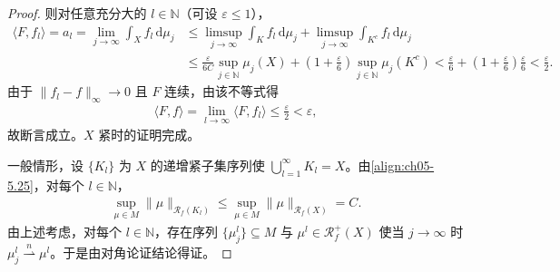 \documentclass[../../main.tex]{subfiles}%
\begin{document}
\begin{proof}
则对任意充分大的 $l\in\mathbb{N}$（可设 $\varepsilon\leqslant1$），
\begin{align*}
\langle F,f_l\rangle=a_l
=\lim_{j\to\infty}\int_X f_l\,\mathrm{d}\mu_j
&\leqslant\limsup_{j\to\infty}\int_K f_l\,\mathrm{d}\mu_j
+\limsup_{j\to\infty}\int_{K^c}f_l\,\mathrm{d}\mu_j\\
&\leqslant\frac{\varepsilon}{6C}\sup_{j\in\mathbb{N}}\mu_j(X)
+\left(1+\frac{\varepsilon}{6}\right)\sup_{j\in\mathbb{N}}\mu_j(K^c)
<\frac{\varepsilon}{6}+\left(1+\frac{\varepsilon}{6}\right)\frac{\varepsilon}{6}
<\frac{\varepsilon}{2}.
\end{align*}
由于 $\|f_l-f\|_\infty\to0$ 且 $F$ 连续，由该不等式得
\begin{align*}
\langle F,f\rangle=\lim_{l\to\infty}\langle F,f_l\rangle
\leqslant\frac{\varepsilon}{2}<\varepsilon,
\end{align*}
故断言成立。$X$ 紧时的证明完成。

一般情形，设 $\{K_l\}$ 为 $X$ 的递增紧子集序列使 $\bigcup_{l=1}^\infty K_l=X$。由\eqref{align:ch05-5.25}，对每个 $l\in\mathbb{N}$，
\begin{align*}
\sup_{\mu\in M}\|\mu\|_{\mathscr{R}_f(K_l)}
\leqslant\sup_{\mu\in M}\|\mu\|_{\mathscr{R}_f(X)}=C.
\end{align*}
由上述考虑，对每个 $l\in\mathbb{N}$，存在序列 $\{\mu_j^l\}\subseteq M$ 与 $\mu^l\in\mathscr{R}^+_f(X)$ 使当 $j\to\infty$ 时 $\mu_j^l\stackrel{n}{\rightharpoonup}\mu^l$。于是由对角论证结论得证。
\end{proof}
\end{document}
